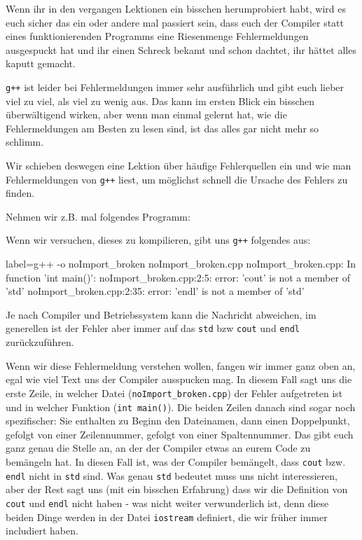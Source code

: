 
Wenn ihr in den vergangen Lektionen ein bisschen herumprobiert habt, wird es
euch sicher das ein oder andere mal passiert sein, dass euch der Compiler statt
eines funktionierenden Programms eine Riesenmenge Fehlermeldungen ausgespuckt
hat und ihr einen Schreck bekamt und schon dachtet, ihr hättet alles kaputt
gemacht.

\texttt{g++} ist leider bei Fehlermeldungen immer sehr ausführlich und gibt
euch lieber viel zu viel, als viel zu wenig aus. Das kann im ersten Blick ein
bisschen überwältigend wirken, aber wenn man einmal gelernt hat, wie die
Fehlermeldungen am Besten zu lesen sind, ist das alles gar nicht mehr so
schlimm.

Wir schieben deswegen eine Lektion über häufige Fehlerquellen ein und wie man
Fehlermeldungen von \texttt{g++} liest, um möglichst schnell die Ursache des
Fehlers zu finden.

Nehmen wir z.B. mal folgendes Programm:


Wenn wir versuchen, dieses zu kompilieren, gibt uns \texttt{g++} folgendes aus:

\begin{textcode*}{label=g++ -o noImport_broken noImport_broken.cpp}
    noImport_broken.cpp: In function 'int main()':
    noImport_broken.cpp:2:5: error: 'cout' is not a member of 'std'
    noImport_broken.cpp:2:35: error: 'endl' is not a member of 'std'
\end{textcode*}

Je nach Compiler und Betriebssystem kann die Nachricht abweichen, im generellen ist der Fehler
aber immer auf das \texttt{std} bzw \texttt{cout} und \texttt{endl} zurückzuführen.

Wenn wir diese Fehlermeldung verstehen wollen, fangen wir immer ganz oben an,
egal wie viel Text uns der Compiler ausspucken mag. In diesem Fall sagt uns die
erste Zeile, in welcher Datei (\texttt{noImport_broken.cpp}) der Fehler aufgetreten ist
und in welcher Funktion (\texttt{int main()}). Die beiden Zeilen
danach sind sogar noch spezifischer: Sie enthalten zu Beginn den Dateinamen,
dann einen Doppelpunkt, gefolgt von einer Zeilennummer, gefolgt von einer
Spaltennummer. Das gibt euch ganz genau die Stelle an, an der der Compiler
etwas an eurem Code zu bemängeln hat. In diesen Fall ist, was der Compiler
bemängelt, dass \texttt{cout} bzw. \texttt{endl} nicht in \texttt{std} sind.
Was genau \texttt{std} bedeutet muss uns nicht interessieren, aber der Rest
sagt uns (mit ein bisschen Erfahrung) dass wir die Definition von \texttt{cout}
und \texttt{endl} nicht haben - was nicht weiter verwunderlich ist, denn diese
beiden Dinge werden in der Datei \texttt{iostream} definiert, die wir früher
immer includiert haben.

